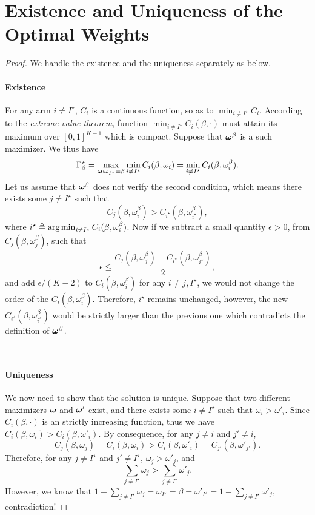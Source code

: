 \section{Existence and Uniqueness of the Optimal Weights}\label{app:optimal_weight}

\restateoptim*

\begin{proof}
We handle the existence and the uniqueness separately as below.
    ~\paragraph{Existence} For any arm $i\neq I^\star$, $C_i$ is a continuous function, so as to $\min_{i\neq I^\star} C_i$. According to the \emph{extreme value theorem}, function $\min_{i\neq I^\star} C_i(\beta,\cdot)$ must attain its maximum over $[0,1]^{K-1}$ which is compact. Suppose that ${\boldsymbol \omega}^\beta$ is a such maximizer. We thus have
    \[
        \Gamma_{\beta}^\star = \max_{{\boldsymbol \omega}:\omega_{I^\star}=\beta}\min_{i\neq I^\star} C_i(\beta,\omega_i) = \min_{i\neq I^\star} C_i(\beta,\omega_i^\beta).
    \]
    Let us assume that ${\boldsymbol \omega}^\beta$ does not verify the second condition, which means there exists some $j\neq I^\star$ such that
    \[
        C_j(\beta,\omega_i^\beta) > C_{i^\star}(\beta,\omega_{i^\star}^\beta),
    \]
    where $i^\star \triangleq \operatorname*{arg\,min}_{i\neq I^\star} C_i(\beta,\omega_i^\beta)$.
    Now if we subtract a small quantity $\epsilon>0$, from $C_j(\beta,\omega_j^\beta)$, such that
    \[
    \epsilon \leq \frac{C_j(\beta,\omega_j^\beta)-C_{i^\star}(\beta,\omega_{i^\star}^\beta)}{2},
    \]
    and add $\epsilon/(K-2)$ to $C_i(\beta,\omega_i^\beta)$ for any $i\neq j,I^\star$, we would not change the order of the $C_i(\beta,\omega_i^\beta)$. Therefore, $i^\star$ remains unchanged, however, the new $C_{i^\star}(\beta,\omega_{i^\star}^\beta)$ would be strictly larger than the previous one which contradicts the definition of ${\boldsymbol \omega}^\beta$.

    ~\paragraph{Uniqueness} We now need to show that the solution is unique. Suppose that two different maximizers ${\boldsymbol \omega}$ and ${\boldsymbol \omega}'$ exist, and there exists some $i\neq I^\star$ such that $\omega_i > \omega'_i$. Since $C_i(\beta,\cdot)$ is an strictly increasing function, thus we have $C_i(\beta,\omega_i)>C_i(\beta,\omega'_i)$. By consequence, for any $j\neq i$ and $j'\neq i$,
    \[
        C_j(\beta,\omega_j) = C_i(\beta,\omega_i) > C_i(\beta,\omega'_i) = C_{j'}(\beta,\omega'_{j'}).
    \]
    Therefore, for any $j\neq I^\star$ and $j'\neq I^\star$, $\omega_j > \omega'_j$, and
    \[
        \sum_{j\neq I^\star} \omega_j > \sum_{j\neq I^\star} \omega'_j.
    \]
    However, we know that $1-\sum_{j\neq I^\star} \omega_j = \omega_{I^\star} =  \beta = \omega'_{I^\star} = 1-\sum_{j\neq I^\star} \omega'_j$, contradiction!
\end{proof}
